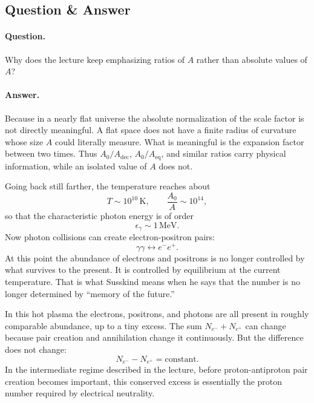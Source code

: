 \subsection{Question \& Answer}

\paragraph{Question.} Why does the lecture keep emphasizing ratios of \(A\) rather than absolute values of \(A\)?

\paragraph{Answer.} Because in a nearly flat universe the absolute normalization of the scale factor is not directly meaningful. A flat space does not have a finite radius of curvature whose size \(A\) could literally measure. What is meaningful is the expansion factor between two times. Thus \(A_0/A_{\mathrm{dec}}\), \(A_0/A_{\mathrm{eq}}\), and similar ratios carry physical information, while an isolated value of \(A\) does not.

Going back still farther, the temperature reaches about
\begin{equation}
T \sim 10^{10}\,\mathrm{K},
\qquad
\frac{A_0}{A} \sim 10^{14},
\end{equation}
so that the characteristic photon energy is of order
\begin{equation}
\epsilon_\gamma \sim 1\,\mathrm{MeV}.
\end{equation}
Now photon collisions can create electron-positron pairs:
\begin{equation}
\gamma\gamma \leftrightarrow e^- e^+.
\end{equation}
At this point the abundance of electrons and positrons is no longer controlled by what survives to the present. It is controlled by equilibrium at the current temperature. That is what Susskind means when he says that the number is no longer determined by ``memory of the future.''

In this hot plasma the electrons, positrons, and photons are all present in roughly comparable abundance, up to a tiny excess. The sum \(N_{e^-}+N_{e^+}\) can change because pair creation and annihilation change it continuously. But the difference does not change:
\begin{equation}
N_{e^-}-N_{e^+}=\mathrm{constant}.
\end{equation}
In the intermediate regime described in the lecture, before proton-antiproton pair creation becomes important, this conserved excess is essentially the proton number required by electrical neutrality.

